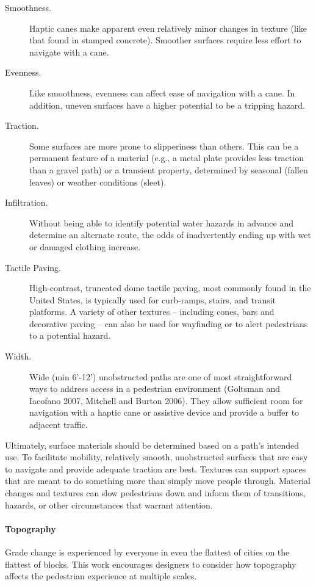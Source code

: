 \begin{description}
    \item[Smoothness.]
Haptic canes make apparent even relatively minor changes in texture (like that found in stamped concrete).  Smoother surfaces require less effort to navigate with a cane.  
    \item[Evenness.]
Like smoothness, evenness can affect ease of navigation with a cane.  In addition, uneven surfaces have a higher potential to be a tripping hazard. 
    \item[Traction.]
Some surfaces are more prone to slipperiness than others. This can be a permanent feature of a material (e.g., a metal plate provides less traction than a gravel path) or a transient property, determined by seasonal (fallen leaves) or weather conditions (sleet).
    \item[Infiltration.] 
Without being able to identify potential water hazards in advance and determine an alternate route, the odds of inadvertently ending up with wet or damaged clothing increase.
    \item[Tactile Paving.] 
High-contrast, truncated dome tactile paving, most commonly found in the United States, is typically used for curb-ramps, stairs, and transit platforms. A variety of other textures -- including cones, bars and decorative paving -- can also be used for wayfinding or to alert pedestrians to a potential hazard.  
    \item[Width.] 
Wide (min 6’-12’) unobstructed paths are one of most straightforward ways to address access in a pedestrian environment (Goltsman and Iacofano 2007, Mitchell and Burton 2006).  They allow sufficient room for navigation with a haptic cane or assistive device and provide a buffer to adjacent traffic.  
    
\end{description}


Ultimately, surface materials should be determined based on a path’s intended use.  To facilitate mobility, relatively smooth, unobstructed surfaces that are easy to navigate and provide adequate traction are best.  Textures can support spaces that are meant to do something more than simply move people through.   Material changes and textures can slow pedestrians down and inform them of transitions, hazards, or other circumstances that warrant attention.

\paragraph{Topography}
Grade change is experienced by everyone in even the flattest of cities on the flattest of blocks.  This work encourages designers to consider how topography affects the pedestrian experience at multiple scales.

